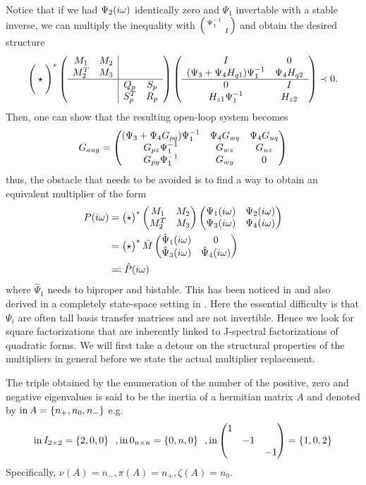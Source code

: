 Notice that if we had $\Psi_2(i\omega)$ identically zero and $\Psi_1$ invertable with a stable inverse, we can multiply 
the inequality with $\begin{psmallmatrix}\Psi_1^{-1}&\\&I\end{psmallmatrix}$ and obtain the desired structure 
\[
\Bigg(\star\Bigg)^*
\left(
\begin{array}{cc|cc}
M_1&M_2&&\\M^T_2&M_3&&\\\hline &&Q_p&S_p\\&&S_p^T&R_p
\end{array}
\right)
\left(
\begin{array}{cc}
	I&0\\
	(\Psi_3 + \Psi_4H_{q1})\Psi_1^{-1} &\Psi_4H_{q2}\\\hline
	0& I\\
	H_{z1}\Psi_1^{-1} &H_{z2}
\end{array}
\right)
\prec 0.
\]
Then, one can show that the resulting open-loop system becomes 
\begin{equation}
G_{aug} = \begin{pmatrix}
(\Psi_3 + \Psi_4G_{pq})\Psi_1^{-1} &\Psi_4G_{wq} &\Psi_4G_{uq}\\
G_{pz}\Psi_1^{-1}                  &G_{wz}       &G_{uz}\\
G_{py}\Psi_1^{-1}                  &G_{wy}       &0\\
\end{pmatrix}
\label{eq:augplant}
\end{equation}
thus, the obstacle that needs to be avoided is to find a way to obtain an equivalent multiplier of the form
\begin{align}
P(\iw) &= \pmatr{\star}^*\pmatr{M_1&M_2\\M^T_2&M_3}\pmatr{\Psi_1(\iw)&\Psi_2(\iw)\\ \Psi_3(\iw)&\Psi_4(\iw)} \\
&= \pmatr{\star}^*\hat{M}\pmatr{\hat{\Psi}_1(\iw)&0\\ \hat{\Psi}_3(\iw)&\hat{\Psi}_4(\iw)}\\
&\mathrel{\reflectbox{$\coloneqq$}} \hat{P}(\iw)
\end{align}
where $\hat{\Psi}_1$ needs to biproper and bistable. This has been noticed in \cite{goh96,goh962} and also derived 
in a completely state-space setting in \cite{veenmanIFAC}. Here the essential difficulty is that $\Psi_i$ are often 
tall basis transfer matrices and are not invertible. Hence we look for square factorizations that are inherently 
linked to J-spectral factorizations of quadratic forms. We will first take a detour on the structural properties 
of the multipliers in general before we state the actual multiplier replacement. 
\begin{define}[Inertia] The triple obtained by the enumeration of the number of the positive, zero and negative eigenvalues is said to be the inertia of a hermitian matrix $A$ and denoted by $\operatorname{in} A = \{n_+,n_0,n_-\}$ e.g. 
\[
\inertia I_{2\times 2} = \{2,0,0\}\ \ , \inertia 0_{n\times n} = \{0,n,0\} \ \ ,\inertia \pmatr{1 &&\\&-1&\\&&-1} = \{1,0,2\}
\]
Specifically, $\nu(A) = n_-, \pi(A) = n_+, \zeta(A) = n_0$.
\end{define}

